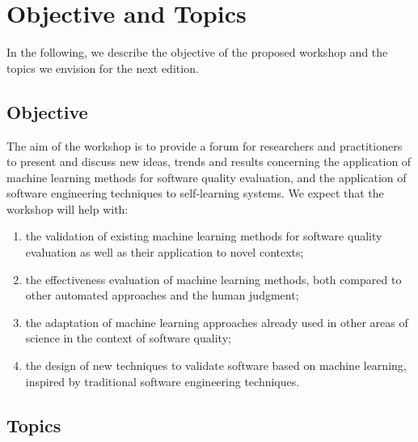
\section{Objective and Topics}
\label{sec:objective}

In the following, we describe the objective of the proposed workshop and the topics we envision for the next edition.

\subsection{Objective}

The aim of the workshop is to provide a forum for researchers and practitioners to present and discuss new ideas, trends and results concerning the application of machine learning methods for software quality evaluation, and the application of software engineering techniques to self-learning systems.
We expect that the workshop will help with:
\begin{enumerate}
    \item the validation of existing machine learning methods for software quality evaluation as well as their application to novel contexts;
    \item the effectiveness evaluation of machine learning methods, both compared to other automated approaches and the human judgment;
    \item the adaptation of machine learning approaches already used in other areas of science in the context of software quality;
    \item the design of new techniques to validate software based on machine learning, inspired by traditional software engineering techniques.
\end{enumerate}

\subsection{Topics}

